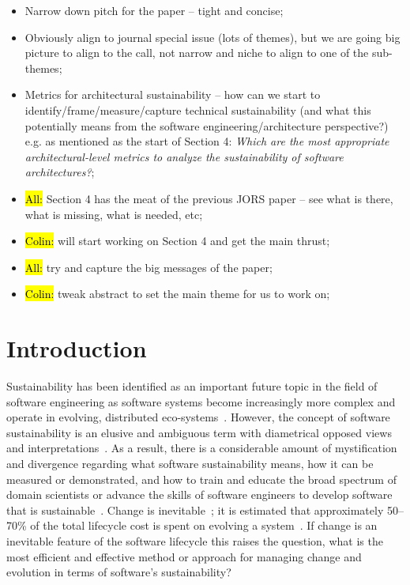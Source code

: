 \documentclass[preprint,12pt,authoryear]{elsarticle}
\begin{document}
\begin{itemize}
\item Narrow down pitch for the paper -- tight and concise;
\item Obviously align to journal special issue (lots of themes), but
we are going big picture to align to the call, not narrow and niche to
align to one of the sub-themes;
\item Metrics for architectural sustainability -- how can we start to
identify/frame/measure/capture technical sustainability (and what this
potentially means from the software engineering/architecture
perspective?) e.g. as mentioned as the start of Section 4:
{\emph{Which are the most appropriate architectural-level metrics to
analyze the sustainability of software architectures?}};
\item \hl{All:} Section 4 has the meat of the previous JORS paper -- see what is
there, what is missing, what is needed, etc;
\item \hl{Colin:} will start working on Section 4 and get the main thrust;
\item \hl{All:} try and capture the big messages of the paper;
\item \hl{Colin:} tweak abstract to set the main theme for us to work on;
\end{itemize}

\section{Introduction}\label{sec:intro}

Sustainability has been identified as an important future topic in the
field of software engineering as software systems become increasingly
more complex and operate in evolving, distributed
eco-systems~\citep{geist+lucas:2009}. However, the concept of software
sustainability is an elusive and ambiguous term with diametrical
opposed views and interpretations~\citep{venters-et-al:2014}. As a
result, there is a considerable amount of mystification and divergence
regarding what software sustainability means, how it can be measured
or demonstrated, and how to train and educate the broad spectrum of
domain scientists or advance the skills of software engineers to
develop software that is
sustainable~\citep{penzenstadler+fleischmann:2011}.  Change is
inevitable~\citep{bener-et-al:2014}; it is estimated that
approximately 50--70\% of the total lifecycle cost is spent on
evolving a system~\citep{ecklund-et-al:1996}. If change is an
inevitable feature of the software lifecycle this raises the question,
what is the most efficient and effective method or approach for
managing change and evolution in terms of software’s sustainability?
\end{document}

